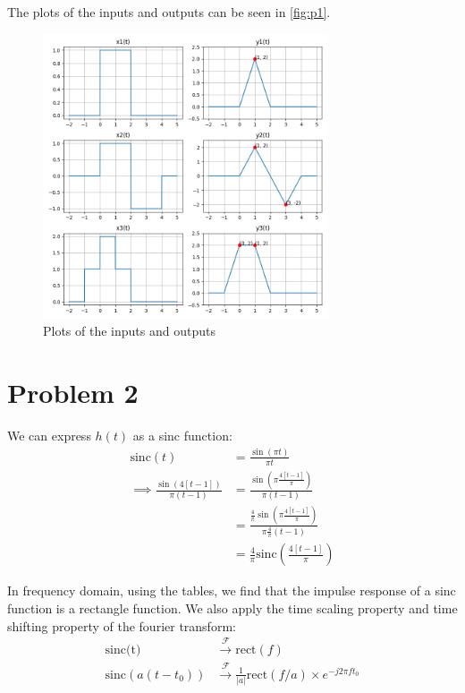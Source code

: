 \documentclass{article}
\begin{document}
The plots of the inputs and outputs can be seen in \autoref{fig:p1}.

\begin{figure}[ht!]
    \centering
    \includegraphics[width=0.75\textwidth]{plot.png}
    \caption{Plots of the inputs and outputs}
    \label{fig:p1}
\end{figure}

\section{Problem 2}
We can express $h(t)$ as a sinc function:
\begin{align*}
    \text{sinc}(t) &= \frac{\sin(\pi t)}{\pi t} \\
    \implies \frac{\sin(4[t-1])}{\pi(t-1)} &= \frac{\sin(\pi \frac{4[t-1]}{\pi})}{\pi(t-1)} \\
    &= \frac{\frac{4}{\pi} \sin(\pi \frac{4[t-1]}{\pi})}{\pi \frac{4}{\pi}(t-1)} \\
    &= \frac{4}{\pi} \text{sinc}\left(\frac{4[t-1]}{\pi}\right)
\end{align*}

In frequency domain, using the tables, we find that the impulse response of a sinc function is a rectangle function. We also apply the time scaling property and time shifting property of the fourier transform:
\begin{align*}
    \text{sinc(t)} &\xrightarrow{\mathcal{F}} \text{rect}(f) \\
    \text{sinc}(a(t-t_0)) &\xrightarrow{\mathcal{F}} \frac{1}{|a|}\text{rect}(f/a) \times e^{-j2\pi f t_0}
\end{align*}
\end{document}
